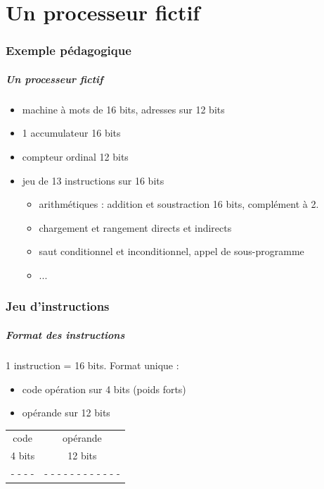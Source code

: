 
\part{Un processeur fictif}

\section{Exemple pédagogique}
\begin{frame}
\frametitle{Un processeur fictif}  

\begin{itemize}
\item machine à mots de 16 bits, adresses sur 12 bits
\item 1 accumulateur 16 bits
\item compteur ordinal 12 bits 
\item jeu de 13 instructions sur 16 bits 
  \begin{itemize}
    \item arithmétiques : addition et soustraction 16 bits, complément à 2.
    \item chargement et rangement directs et indirects
      \item saut conditionnel et inconditionnel, appel de sous-programme
      \item ...
  \end{itemize}
\end{itemize}
\end{frame}


\section{Jeu d'instructions}

\begin{frame}
  \frametitle{Format des instructions}

  1 instruction = 16 bits. Format unique : 
\begin{itemize} 
\item \alert{code opération} sur 4 bits (poids forts)
\item \alert{opérande} sur 12 bits
\end{itemize}

\begin{center}
\begin{tabular}{|c|c|}
\hline
code & opérande \\
4 bits & 12 bits \\
\hline
- - - - & - - - - - - - - - - - - \\
\hline
\end{tabular}
\end{center}
\end{frame}

